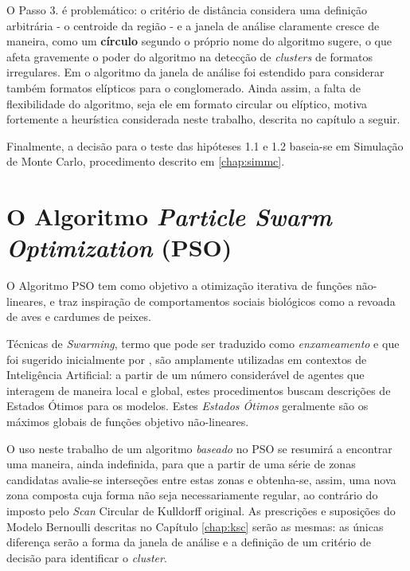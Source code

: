 \documentclass[
	12pt,				%
	openright,			%
	twoside,			%
	a4paper,			%
	english,			%
	brazil,				%
	]{abntex2}
\begin{document}
O Passo 3. é problemático: o critério de distância considera uma definição arbitrária - o centroide da região - e a janela de análise claramente cresce de maneira, como um \textbf{círculo} segundo o próprio nome do algoritmo sugere, o que afeta gravemente o poder do algoritmo na detecção de \textit{clusters} de formatos irregulares. Em \cite{kulldorff2006elliptic} o algoritmo da janela de análise foi estendido para considerar também formatos elípticos para o conglomerado. Ainda assim, a falta de flexibilidade do algoritmo, seja ele em formato circular ou elíptico, motiva fortemente a heurística considerada neste trabalho, descrita no capítulo a seguir.

Finalmente, a decisão para o teste das hipóteses 1.1 e 1.2 baseia-se em Simulação de Monte Carlo, procedimento descrito em \ref{chap:simmc}.



\chapter{O Algoritmo \textit{Particle Swarm Optimization} (PSO)}

O Algoritmo PSO tem como objetivo a otimização iterativa de funções não-lineares, e traz inspiração de comportamentos sociais biológicos como a revoada de aves e cardumes de peixes. 

Técnicas de \textit{Swarming}, termo que pode ser traduzido como \textit{enxameamento} e que foi sugerido inicialmente por \cite{beni1993swarm}, são amplamente utilizadas em contextos de Inteligência Artificial: a partir de um número considerável de agentes que interagem de maneira local e global, estes procedimentos buscam descrições de Estados Ótimos para os modelos. Estes \textit{Estados Ótimos} geralmente são os máximos globais de funções objetivo não-lineares.

O uso neste trabalho de um algoritmo \textit{baseado} no PSO se resumirá a encontrar uma maneira, ainda indefinida, para que a partir de uma série de zonas candidatas avalie-se interseções entre estas zonas e obtenha-se, assim, uma nova zona composta cuja forma não seja necessariamente regular, ao contrário do imposto pelo \textit{Scan} Circular de Kulldorff original. As prescrições e suposições do Modelo Bernoulli descritas no Capítulo \ref{chap:ksc} serão as mesmas: as únicas diferença serão a forma da janela de análise e a definição de um critério de decisão para identificar o \textit{cluster}.


\end{document}
